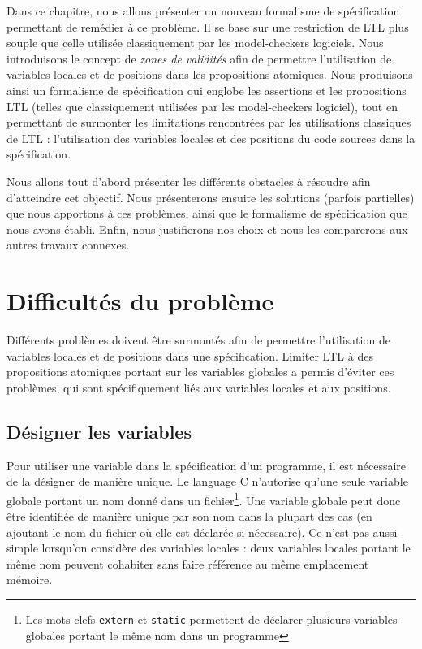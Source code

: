 Dans ce chapitre, nous allons présenter un nouveau formalisme de spécification
permettant de remédier à ce problème. Il se base sur une restriction de \ac{LTL}
plus souple que celle utilisée classiquement par les model-checkers logiciels.
Nous introduisons le concept de \emph{zones de validités} afin de permettre
l'utilisation de variables locales et de positions dans les propositions
atomiques. Nous produisons ainsi un formalisme de spécification qui englobe les
assertions et les propositions LTL (telles que classiquement utilisées par les
model-checkers logiciel), tout en permettant de surmonter les limitations
rencontrées par les utilisations classiques de LTL : l'utilisation des variables
locales et des positions du code sources dans la spécification.

Nous allons tout d'abord présenter les différents obstacles à résoudre afin
d'atteindre cet objectif. Nous présenterons ensuite les solutions (parfois partielles)
que nous apportons à ces problèmes, ainsi que le formalisme de spécification que
nous avons établi. Enfin, nous justifierons nos choix et nous les comparerons
aux autres travaux connexes.

\section{Difficultés du problème}

Différents problèmes doivent être surmontés afin de permettre l'utilisation de
variables locales et de positions dans une spécification.
Limiter \ac{LTL} à des propositions atomiques portant sur les variables globales
a permis d'éviter ces problèmes, qui sont spécifiquement liés aux variables
locales et aux positions.

\subsection{Désigner les variables}

Pour utiliser une variable dans la spécification d'un programme, il est
nécessaire de la désigner de manière unique.
Le language C n'autorise qu'une seule variable globale portant un nom
donné dans un fichier\footnote{Les mots clefs \texttt{extern} et
\texttt{static} permettent de déclarer plusieurs variables globales
portant le même nom dans un programme}. Une variable globale peut donc être
identifiée de manière unique par son nom dans la plupart des cas (en ajoutant le
nom du fichier où elle est déclarée si nécessaire). Ce n'est pas
aussi simple lorsqu'on considère des variables locales : deux variables
locales portant le même nom peuvent cohabiter sans faire référence au
même emplacement mémoire.

